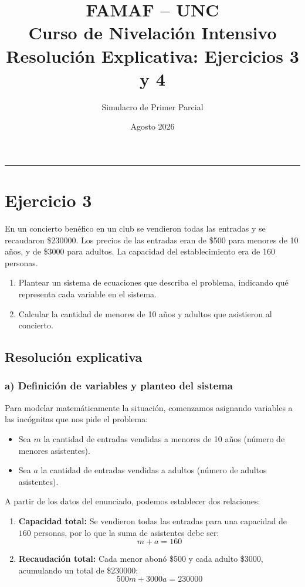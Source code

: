 \documentclass[11pt,a4paper]{article}
\title{\textbf{FAMAF -- UNC \\ Curso de Nivelación Intensivo \\ Resolución Explicativa: Ejercicios 3 y 4}}
\author{Simulacro de Primer Parcial}
\date{Agosto 2026}
\begin{document}
\maketitle

\hrule
\vspace{0.5cm}

\section*{Ejercicio 3}

\begin{tcolorbox}[colback=gray!5!white,colframe=gray!75!black,title=\textbf{Enunciado}]
En un concierto benéfico en un club se vendieron todas las entradas y se recaudaron \$230000. Los precios de las entradas eran de \$500 para menores de 10 años, y de \$3000 para adultos. La capacidad del establecimiento era de 160 personas.
\begin{enumerate}[label=\textbf{\alph*)}]
    \item Plantear un sistema de ecuaciones que describa el problema, indicando qué representa cada variable en el sistema.
    \item Calcular la cantidad de menores de 10 años y adultos que asistieron al concierto.
\end{enumerate}
\end{tcolorbox}

\subsection*{Resolución explicativa}

\subsubsection*{a) Definición de variables y planteo del sistema}

Para modelar matemáticamente la situación, comenzamos asignando variables a las incógnitas que nos pide el problema:
\begin{itemize}
    \item Sea $m$ la cantidad de entradas vendidas a menores de 10 años (número de menores asistentes).
    \item Sea $a$ la cantidad de entradas vendidas a adultos (número de adultos asistentes).
\end{itemize}

A partir de los datos del enunciado, podemos establecer dos relaciones:
\begin{enumerate}
    \item \textbf{Capacidad total:} Se vendieron todas las entradas para una capacidad de $160$ personas, por lo que la suma de asistentes debe ser:
    \begin{equation}
        m + a = 160
    \end{equation}
    \item \textbf{Recaudación total:} Cada menor abonó \$500 y cada adulto \$3000, acumulando un total de \$230000:
    \begin{equation}
        500m + 3000a = 230000
    \end{equation}
\end{enumerate}
\end{document}
